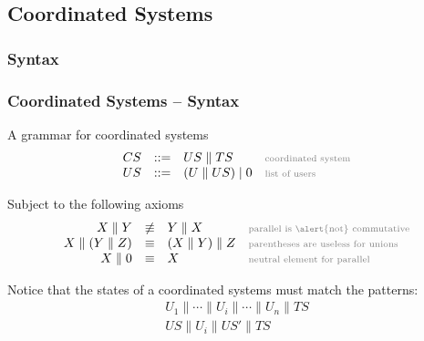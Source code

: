 \documentclass[handout]{beamer}\mode<presentation>{\usetheme{AMSCesenaBleu}}
\begin{document}
\subsection{Coordinated Systems}

\subsubsection{Syntax}

\begin{frame}
\frametitle{Coordinated Systems -- Syntax}

    \begin{block}{A grammar for coordinated systems}
        \[\begin{array}{rcll}
            CS &::=& US \parallel TS & \mathhint{coordinated system}\\
            US &::=& (U \parallel US) \mid 0 & \mathhint{list of users}
        \end{array}\]
    \end{block}
    
    \pause
    
    \begin{block}{Subject to the following axioms}
        \[\begin{array}{rcll}
            X \parallel Y &\not\equiv& Y \parallel X & \mathhint{parallel is \alert{not} commutative} \\
            X \parallel (Y \parallel Z) &\equiv& (X \parallel  Y) \parallel Z & \mathhint{parentheses are useless for unions} \\
            X \parallel 0 &\equiv& X & \mathhint{neutral element for parallel}
        \end{array}\]
    \end{block}
    
    \pause\vfill
    
    \begin{block}{}
	    Notice that the states of a coordinated systems must match the patterns:
	    \[\begin{array}{c}
	        U_1 \parallel \cdots \parallel U_i \parallel \cdots \parallel U_n \parallel TS\\
	        US \parallel U_i \parallel US' \parallel TS
	 	\end{array}\]
    \end{block}
    
\end{frame}
\end{document}
